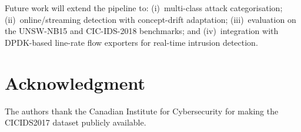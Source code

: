 \documentclass[conference]{IEEEtran}
\begin{document}
Future work will extend the pipeline to: (i)~multi-class attack
categorisation; (ii)~online/streaming detection with concept-drift
adaptation; (iii)~evaluation on the UNSW-NB15 and CIC-IDS-2018
benchmarks; and (iv)~integration with DPDK-based line-rate flow
exporters for real-time intrusion detection.

\section*{Acknowledgment}
The authors thank the Canadian Institute for Cybersecurity for making
the CICIDS2017 dataset publicly available.

\balance

\end{document}
